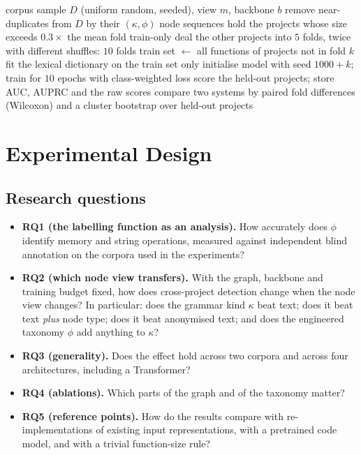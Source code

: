 \documentclass[pdflatex,sn-basic]{sn-jnl}
\theoremstyle{thmstyleone}%
\begin{document}
\begin{algorithm}[t]
\caption{Cross-project evaluation of one (view, backbone) system}
\label{alg:protocol}
\begin{algorithmic}[1]
\Require corpus sample $D$ (uniform random, seeded), view $m$, backbone $b$
\State remove near-duplicates from $D$ by their $(\kappa,\phi)$ node sequences
\State hold the projects whose size exceeds $0.3\times$ the mean fold train-only
\State deal the other projects into $5$ folds, twice with different shuffles: $10$ folds
   \State train set $\leftarrow$ all functions of projects not in fold $k$
   \State fit the lexical dictionary on the train set only
   \State initialise model with seed $1000+k$; train for $10$ epochs with class-weighted loss
   \State score the held-out projects; store AUC, AUPRC and the raw scores
\EndFor
\State compare two systems by paired fold differences (Wilcoxon) and a cluster bootstrap over held-out projects
\end{algorithmic}
\end{algorithm}


\section{Experimental Design}
\label{sec:experiment}

\subsection{Research questions}
\begin{itemize}
    \item \textbf{RQ1 (the labelling function as an analysis).} How accurately
          does $\phi$ identify memory and string operations, measured against
          independent blind annotation on the corpora used in the
          experiments?
    \item \textbf{RQ2 (which node view transfers).} With the graph, backbone
          and training budget fixed, how does cross-project detection change
          when the node view changes? In particular: does the grammar kind
          $\kappa$ beat text; does it beat text \emph{plus} node type; does it
          beat anonymised text; and does the engineered taxonomy $\phi$ add
          anything to $\kappa$?
    \item \textbf{RQ3 (generality).} Does the effect hold across two corpora
          and across four architectures, including a Transformer?
    \item \textbf{RQ4 (ablations).} Which parts of the graph and of the
          taxonomy matter?
    \item \textbf{RQ5 (reference points).} How do the results compare with
          re-implementations of existing input representations, with a
          pretrained code model, and with a trivial function-size rule?
\end{itemize}
\end{document}
